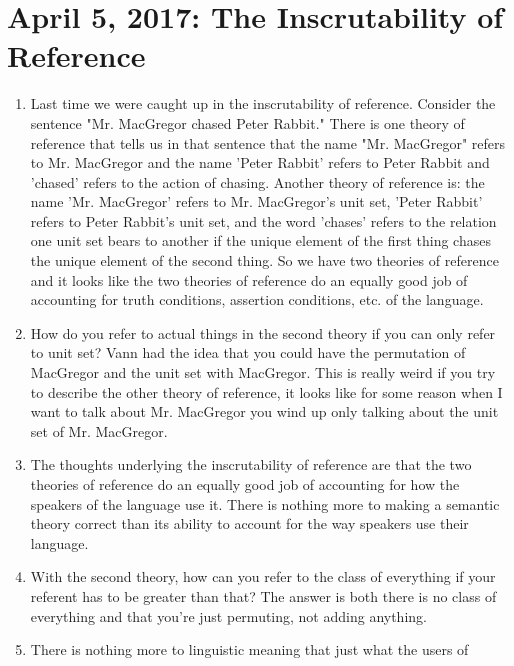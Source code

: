 \documentclass[12pt]{article}
\theoremstyle{definition}
\begin{document}
\section{April 5, 2017: The Inscrutability of Reference}

\begin{enumerate}
    \itemsep0em 
    \item
        Last time we were caught up in the inscrutability of reference.
        Consider the sentence "Mr. MacGregor chased Peter Rabbit." There is one
        theory of reference that tells us in that sentence that the name "Mr.
        MacGregor" refers to Mr. MacGregor and the name 'Peter Rabbit' refers
        to Peter Rabbit and 'chased' refers to the action of chasing. Another
        theory of reference is: the name 'Mr. MacGregor' refers to Mr.
        MacGregor's unit set, 'Peter Rabbit' refers to Peter Rabbit's unit set,
        and the word 'chases' refers to the relation one unit set bears to
        another if the unique element of the first thing chases the unique
        element of the second thing. So we have two theories of reference and
        it looks like the two theories of reference do an equally good job of
        accounting for truth conditions, assertion conditions, etc. of the
        language.
    \item
        How do you refer to actual things in the second theory if you can only
        refer to unit set? Vann had the idea that you could have the
        permutation of MacGregor and the unit set with MacGregor. This is
        really weird if you try to describe the other theory of reference, it
        looks like for some reason when I want to talk about Mr. MacGregor you
        wind up only talking about the unit set of Mr. MacGregor.
    \item
        The thoughts underlying the inscrutability of reference are that the
        two theories of reference do an equally good job of accounting for how
        the speakers of the language use it. There is nothing more to making a
        semantic theory correct than its ability to account for the way
        speakers use their language.
    \item
        With the second theory, how can you refer to the class of everything if
        your referent has to be greater than that? The answer is both there is
        no class of everything and that you're just permuting, not adding
        anything.
    \item
        There is nothing more to linguistic meaning that just what the users of

\end{enumerate}
\end{document}
